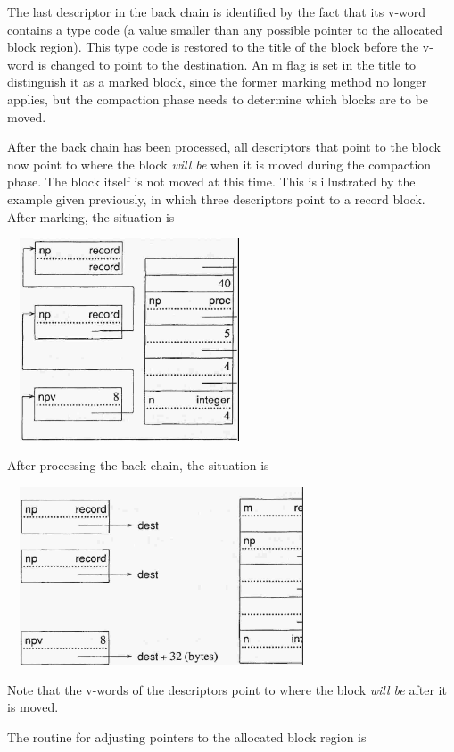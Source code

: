 The last descriptor in the back chain is identified by the fact that
its v-word contains a type code (a value smaller than any possible
pointer to the allocated block region). This type code is restored to
the title of the block before the v-word is changed to point to the
destination. An m flag is set in the title to distinguish it as a
marked block, since the former marking method no longer applies, but
the compaction phase needs to determine which blocks are to be moved.

After the back chain has been processed, all descriptors that point to
the block now point to where the block \textit{will be }when it is
moved during the compaction phase. The block itself is not moved at
this time. This is illustrated by the example given previously, in
which three descriptors point to a record block. After marking, the
situation is

\ \  \includegraphics[width=2.5654in,height=2.3602in]{ib-img/ib-img103.jpg} 

After processing the back chain, the situation is

\ \  \includegraphics[width=3.3134in,height=2.0772in]{ib-img/ib-img104.jpg} 

Note that the v-words of the descriptors point to where the block
\textit{will be} after it is moved.

The routine for adjusting pointers to the allocated block region is


